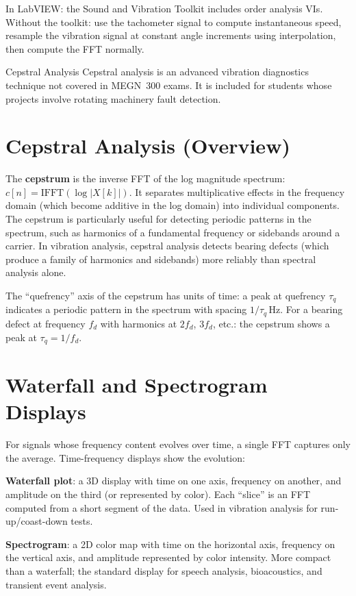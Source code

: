 \documentclass[11pt,letterpaper,twoside,openany]{book}
\begin{document}
In LabVIEW: the Sound and Vibration Toolkit includes order analysis VIs. Without the toolkit: use the tachometer signal to compute instantaneous speed, resample the vibration signal at constant angle increments using interpolation, then compute the FFT normally.

\begin{advancedbox}{Cepstral Analysis}
Cepstral analysis is an advanced vibration diagnostics technique not covered in MEGN~300 exams. It is included for students whose projects involve rotating machinery fault detection.
\end{advancedbox}
\section{Cepstral Analysis (Overview)}
The \textbf{cepstrum} is the inverse FFT of the log magnitude spectrum: $c[n] = \text{IFFT}(\log|X[k]|)$. It separates multiplicative effects in the frequency domain (which become additive in the log domain) into individual components. The cepstrum is particularly useful for detecting periodic patterns in the spectrum, such as harmonics of a fundamental frequency or sidebands around a carrier. In vibration analysis, cepstral analysis detects bearing defects (which produce a family of harmonics and sidebands) more reliably than spectral analysis alone.

The ``quefrency'' axis of the cepstrum has units of time: a peak at quefrency $\tau_q$ indicates a periodic pattern in the spectrum with spacing $1/\tau_q$\,Hz. For a bearing defect at frequency $f_d$ with harmonics at $2f_d$, $3f_d$, etc.: the cepstrum shows a peak at $\tau_q = 1/f_d$.

\section{Waterfall and Spectrogram Displays}
For signals whose frequency content evolves over time, a single FFT captures only the average. Time-frequency displays show the evolution:

\textbf{Waterfall plot}: a 3D display with time on one axis, frequency on another, and amplitude on the third (or represented by color). Each ``slice'' is an FFT computed from a short segment of the data. Used in vibration analysis for run-up/coast-down tests.

\textbf{Spectrogram}: a 2D color map with time on the horizontal axis, frequency on the vertical axis, and amplitude represented by color intensity. More compact than a waterfall; the standard display for speech analysis, bioacoustics, and transient event analysis.
\end{document}
